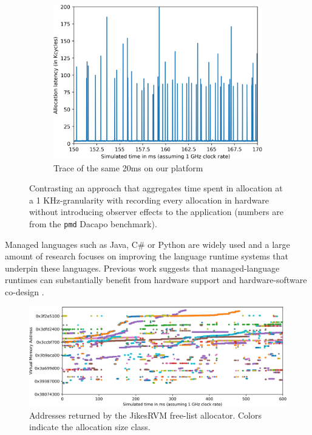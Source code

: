 \begin{figure}
\begin{subfigure}[t]{0.33\textwidth}
		\includegraphics[width=\textwidth]{results/java-alloc-detailed.png}
		\caption{Trace of the same 20ms on our platform}
	\end{subfigure}
	\caption{Contrasting an approach that aggregates time spent in allocation at a 1 KHz-granularity with recording every allocation in hardware without introducing observer effects to the application (numbers are from the \texttt{pmd} Dacapo benchmark).}
	\label{fig:java_alloc}
\end{figure}

Managed languages such as Java, C\# or Python are widely used and a large amount of research focuses on improving the language runtime systems that underpin these languages. Previous work suggests that managed-language runtimes can substantially benefit from hardware support and hardware-software co-design \cite{Click:2005:PGA:1064979.1064988,Wright:2005:OMA:1698178,Ungar:1984:ASS:800015.808182,Joao:2009:FRH:1555754.1555806}.


\begin{figure}[t]
		\centering
		\includegraphics[width=\columnwidth]{results/heatmap.png}
		\caption{Addresses returned by the JikesRVM free-list allocator. Colors indicate the allocation size class.}
		\label{fig:java_alloc_heatmap}
\end{figure}

